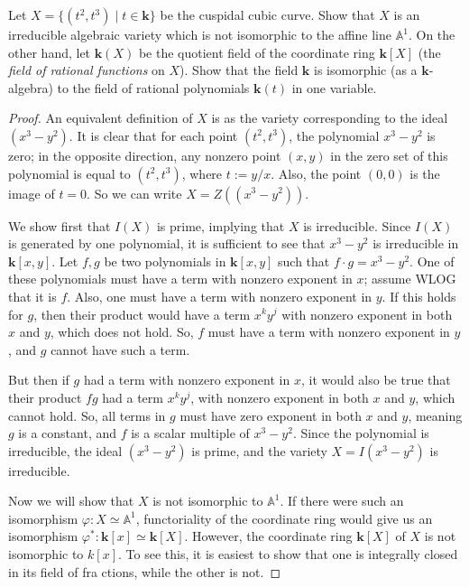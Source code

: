 \documentclass[12pt]{article}
\theoremstyle{definition}
\newenvironment{problem}[2][Problem]{\begin{trivlist}
\item[\hskip \labelsep {\bfseries #1}\hskip \labelsep {\bfseries #2.}]}{\end{trivlist}}
\begin{document}
\begin{problem}{5}
	Let $X = \{(t^2, t^3) \mid t \in \mathbf k\}$ be the cuspidal cubic curve. Show that $X$ is an irreducible algebraic variety which is not isomorphic to the affine line $\mathbb A^1$. On the other hand, let $\mathbf{k}(X)$ be the quotient field of the coordinate ring $\mathbf k[X]$ (the \textit{field of rational functions} on $X$). Show that the field $\mathbf k$ is isomorphic (as a $\mathbf k$-algebra) to the field of rational polynomials $\mathbf k(t)$ in one variable.
\begin{proof}
	\par An equivalent definition of $X$ is as the variety corresponding to the ideal $(x^3 - y^2)$. It is clear that for each point $(t^2, t^3)$, the polynomial $x^3 - y^2$ is zero; in the opposite direction, any nonzero point $(x, y)$ in the zero set of this polynomial is equal to $(t^2, t^3)$, where $t := y/x$. Also, the point $(0,0)$ is the image of $t = 0$. So we can write $X = Z( (x^3- y^2))$.
	\par We show first that $I(X)$ is prime, implying that $X$ is irreducible. Since $I(X)$ is generated by one polynomial, it is sufficient to see that $x^3 - y^2$ is irreducible in $\mathbf k[x,y]$. Let $f, g$ be two polynomials in $\mathbf k [x,y]$ such that $f \cdot g = x^3 - y^2$. One of these polynomials must have a term with nonzero exponent in $x$; assume WLOG that it is $f$. Also, one must have a term with nonzero exponent in $y$. If this holds for $g$, then their product would have a term $x^ky^j$ with nonzero exponent in both $x$ and $y$, which does not hold. So, $f$ must have a term with nonzero exponent in $y$, and $g$ cannot have such a term. 
	\par But then if $g$ had a term with nonzero exponent in $x$, it would also be true that their product $fg$ had a term $x^ky^j$, with nonzero exponent in both $x$ and $y$, which cannot hold. So, all terms in $g$ must have zero exponent in both $x$ and $y$, meaning $g$ is a constant, and $f$ is a scalar multiple of $x^3 - y^2$. Since the polynomial is irreducible, the ideal $(x^3 - y^2)$ is prime, and the variety $X = I(x^3 - y^2)$ is irreducible.
	\par Now we will show that $X$ is not isomorphic to $\mathbb A^1$. If there were such an isomorphism $\varphi : X \simeq \mathbb A^1$, functoriality of the coordinate ring would give us an isomorphism $\varphi^* : \mathbf k[x] \simeq \mathbf k[X]$. However, the coordinate ring $\mathbf k[X]$ of $X$ is not isomorphic to $k[x]$. To see this, it is easiest to show that one is integrally closed in its field of fra ctions, while the other is not.

\end{proof}
\end{problem}
\end{document}
